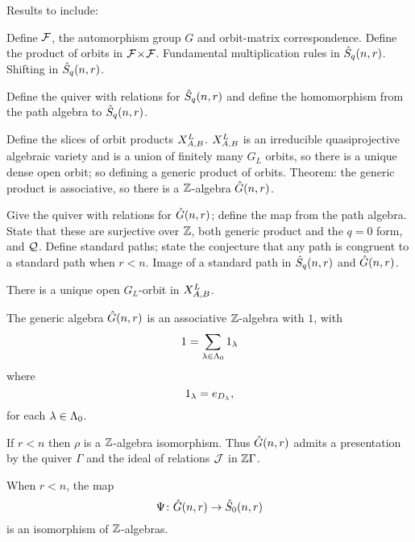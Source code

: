 \documentclass[a4paper, 11pt]{report}
\begin{document}
{\color{gray}
Results to include:

Define $\flags$, the automorphism group $G$ and orbit-matrix correspondence.
Define the product of orbits in $\dblflags$.
Fundamental multiplication rules in $\qschur$.
Shifting in $\qschur$.

Define the quiver with relations for $\qschur$ and define the homomorphism from the path algebra to $\qschur$.

Define the slices of orbit products $\xprod[L]{A,B}$.
$\xprod[L]{A,B}$ is an irreducible quasiprojective algebraic variety and is a union of finitely many $G_L$ orbits, so there is a unique dense open orbit; so defining a generic product of orbits.
Theorem: the generic product is associative, so there is a $\integers$-algebra $\generic$.

Give the quiver with relations for $\generic$; define the map from the path algebra.
State that these are surjective over $\integers$, both generic product and the $q=0$ form, and $\qfrac$.
Define standard paths; state the conjecture that any path is congruent to a standard path when $r<n$.
Image of a standard path in $\qschur$ and $\generic$.
}



\begin{proposition*}
There is a unique open $G_L$-orbit in $\xprod[L]{A,B}$.
\end{proposition*}

\begin{proposition*}
The generic algebra $\generic$ is an associative $\integers$-algebra with $1$, with
\begin{equation*}
1=\sum_{\lambda\in\compositions} 1_\lambda
\end{equation*}
where
\begin{equation*}
1_\lambda = e_{\diag{\lambda}},
\end{equation*}
for each $\lambda\in\compositions$.
\end{proposition*}

\begin{theorem*}
If $r<n$ then $\rho$ is a $\integers$-algebra isomorphism. Thus $\generic$ admits a presentation by the quiver $\Gamma$ and the ideal of relations $\zerorelations$ in $\integers\Gamma$.
\end{theorem*}

\begin{theorem*}
When $r<n$, the map
\begin{equation*}
\Psi\colon\generic\to\zeroschur
\end{equation*}
is an isomorphism of $\integers$-algebras.
\end{theorem*}
\end{document}
